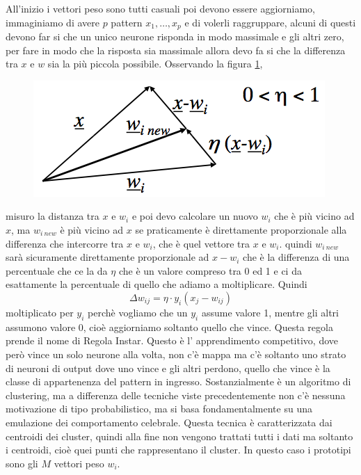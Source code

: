 \noindent All'inizio i vettori peso sono tutti casuali poi devono essere aggiorniamo, immaginiamo di avere $p$ pattern $x_1, \dots, x_p$ e di volerli raggruppare, alcuni di questi devono far si che un unico neurone risponda in modo massimale e gli altri zero, per fare in modo che la risposta sia massimale allora devo fa si che la differenza tra $x$ e $w$ sia la più piccola possibile. Osservando la figura \ref{learn},
\begin{figure}
\centering
\includegraphics[scale=0.6]{img/learn.png}
\caption{}
\label{learn}
\end{figure}
misuro la distanza tra $x$ e $w_i$ e poi devo calcolare un nuovo $w_i$ che è più vicino ad $x$, ma $w_{i \ new}$ è più vicino ad $x$ se praticamente è direttamente proporzionale alla differenza che intercorre tra $x$ e $w_i$, che è quel vettore tra $x$ e $w_i$. quindi $w_{i \ new}$ sarà sicuramente direttamente proporzionale ad $x-w_i$ che è la differenza di una percentuale che ce la da $\eta$ che è un valore compreso tra 0 ed 1 e ci da esattamente la percentuale di quello che adiamo a moltiplicare. Quindi
\begin{equation}
\Delta w_{ij} = \eta \cdot y_i (x_j-w_{ij}) 
\end{equation}
moltiplicato per $y_i$ perchè vogliamo che un $y_i$ assume valore 1, mentre gli altri assumono valore 0, cioè aggiorniamo soltanto quello che vince. Questa regola prende il nome di Regola Instar. Questo è l' apprendimento competitivo, dove però vince un solo neurone alla volta, non c'è mappa ma c'è soltanto uno strato di neuroni di output dove uno vince e gli altri perdono, quello che vince è la classe di appartenenza del pattern in ingresso. Sostanzialmente è un algoritmo di clustering, ma a differenza delle tecniche viste precedentemente non c'è nessuna motivazione di tipo probabilistico, ma si basa fondamentalmente su una emulazione dei comportamento celebrale. Questa tecnica è caratterizzata dai centroidi dei cluster, quindi alla fine non vengono trattati tutti i dati ma soltanto i centroidi, cioè quei punti che rappresentano il cluster. In questo caso i prototipi sono gli $M$ vettori peso $w_i$.\\

